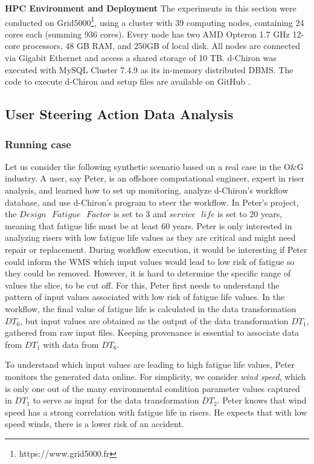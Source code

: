 \textbf{HPC Environment and Deployment}
The experiments in this section were conducted on Grid5000\footnote{https://www.grid5000.fr}, using a
cluster with 39 computing nodes, containing 24 cores each (summing 936 cores).
Every node has two AMD Opteron 1.7 GHz 12-core processors, 48 GB RAM, and
250GB of local disk. All nodes are connected via Gigabit Ethernet and
access a shared storage of 10 TB.
d-Chiron was executed with MySQL Cluster 7.4.9 as its in-memory distributed DBMS. The code to execute d-Chiron and setup files are available on GitHub \cite{d-ChironGitHub}.




\subsection{User Steering Action Data Analysis}
\label{sec_exp_rfa_data_reduction_analysis}

\subsubsection{Running case}

Let us consider the following  
synthetic scenario based on a real case in the O\&G industry. 
A user, say Peter,
is an offshore computational engineer, 
expert in riser analysis, and learned how to set up monitoring, analyze
d-Chiron's workflow database, and use d-Chiron's  program to steer the workflow.
In Peter's project, the $Design \text{ } Fatigue \text{ } Factor$ is set to 3 and $service \text{ }
life$ is set to 20 years, meaning that fatigue life must be at least 60
years. Peter is only interested in analyzing risers with low fatigue
life values as they are critical and might need repair or
replacement. During workflow execution, it would be interesting if Peter
could inform the WMS which input values would lead to low risk of
fatigue so they could be removed. However, it is hard to determine the specific range of values \ie{} the
slice, to be cut off. For this, Peter first needs to understand the
pattern of input values associated with low risk of fatigue life values.
In the workflow, the final value of fatigue life is calculated in the
data transformation $DT_6$, but input values are obtained as the output of
the data transformation $DT_1$, gathered from raw input files. Keeping provenance is essential to
associate data from $DT_1$ with data from $DT_6$.

To understand which input values are leading to high fatigue life
values, Peter monitors the generated data online. For simplicity, we
consider \textit{wind speed}, which is only one out of the many
environmental condition parameter values captured in $DT_1$ to serve
as input for the data transformation $DT_2$.
 Peter knows that wind speed has a strong
correlation with fatigue life in risers. He expects that with low speed
winds, there is a lower risk of an accident.


